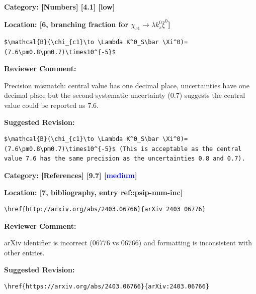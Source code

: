 \documentclass[12pt]{article}
\begin{document}
\begin{reviewer}
\noindent \textbf{Category: [Numbers] [4.1] [low]}

\noindent \textbf{Location: [6, branching fraction for $\chi_{c1}\to \lambda k^0_s\bar \xi^0$]}

\begin{lstlisting}[breaklines=true]
	$\mathcal{B}(\chi_{c1}\to \Lambda K^0_S\bar \Xi^0)=(7.6\pm0.8\pm0.7)\times10^{-5}$
\end{lstlisting}

\textbf{Reviewer Comment:}

Precision mismatch: central value has one decimal place, uncertainties have one decimal place but the second systematic uncertainty (0.7) suggests the central value could be reported as 7.6.

\textbf{Suggested Revision:}

\begin{lstlisting}[breaklines=true]
	$\mathcal{B}(\chi_{c1}\to \Lambda K^0_S\bar \Xi^0)=(7.6\pm0.8\pm0.7)\times10^{-5}$ (This is acceptable as the central value 7.6 has the same precision as the uncertainties 0.8 and 0.7).
\end{lstlisting}

\end{reviewer}

\begin{reviewer}
\noindent \textbf{Category: [References] [9.7] [\textcolor{blue}{medium}]}

\noindent \textbf{Location: [7, bibliography, entry ref::psip-num-inc]}

\begin{lstlisting}[breaklines=true]
	\href{http://arxiv.org/abs/2403.06766}{arXiv 2403 06776}
\end{lstlisting}

\textbf{Reviewer Comment:}

arXiv identifier is incorrect (06776 vs 06766) and formatting is inconsistent with other entries.

\textbf{Suggested Revision:}

\begin{lstlisting}[breaklines=true]
	\href{https://arxiv.org/abs/2403.06766}{arXiv:2403.06766}
\end{lstlisting}

\end{reviewer}
\end{document}
